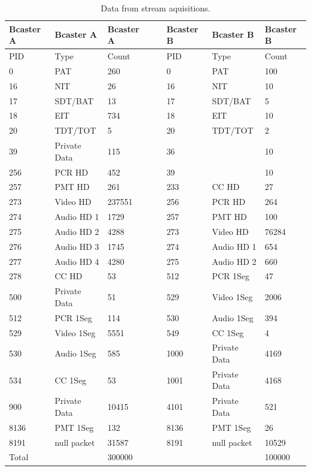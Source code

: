\documentclass[
	12pt,				%
	openright,			%
	twoside,			%
	a4paper,			%
	brazil,
	french,				%
	english
	]{abntex2}
\begin{document}
\begin{table}[b]
\centering
    \caption {Data from stream aquisitions.}
    \begin{tabular}{|l|l|l|l|l|l|l|}
    \hline
     Bcaster A  & Bcaster A          & Bcaster A    & ~ & Bcaster B & Bcaster B         & Bcaster B   \\ \hline
    PID   & Type         & Count  & ~ & PID  & Type         & Count  \\ \hline
    0     & PAT          & 260    & ~ & 0    & PAT          & 100    \\ \hline
    16    & NIT          & 26     & ~ & 16   & NIT          & 10     \\ \hline
    17    & SDT/BAT      & 13     & ~ & 17   & SDT/BAT      & 5      \\ \hline
    18    & EIT          & 734    & ~ & 18   & EIT          & 10     \\ \hline
    20    & TDT/TOT      & 5      & ~ & 20   & TDT/TOT      & 2      \\ \hline
    39    & Private Data & 115    & ~ & 36   & ~            & 10     \\ \hline
    256   & PCR HD       & 452    & ~ & 39   & ~            & 10     \\ \hline
    257   & PMT HD       & 261    & ~ & 233  & CC HD        & 27     \\ \hline
    273   & Video HD     & 237551 & ~ & 256  & PCR HD       & 264    \\ \hline
    274   & Audio HD 1   & 1729   & ~ & 257  & PMT HD       & 100    \\ \hline
    275   & Audio HD 2   & 4288   & ~ & 273  & Video HD     & 76284  \\ \hline
    276   & Audio HD 3   & 1745   & ~ & 274  & Audio HD 1   & 654    \\ \hline
    277   & Audio HD 4   & 4280   & ~ & 275  & Audio HD 2   & 660    \\ \hline
    278   & CC HD        & 53     & ~ & 512  & PCR 1Seg     & 47     \\ \hline
    500   & Private Data & 51     & ~ & 529  & Video 1Seg   & 2006   \\ \hline
    512   & PCR 1Seg     & 114    & ~ & 530  & Audio 1Seg   & 394    \\ \hline
    529   & Video 1Seg   & 5551   & ~ & 549  & CC 1Seg      & 4      \\ \hline
    530   & Audio 1Seg   & 585    & ~ & 1000 & Private Data & 4169   \\ \hline
    534   & CC 1Seg      & 53     & ~ & 1001 & Private Data & 4168   \\ \hline
    900   & Private Data & 10415  & ~ & 4101 & Private Data & 521    \\ \hline
    8136  & PMT 1Seg     & 132    & ~ & 8136 & PMT 1Seg     & 26     \\ \hline
    8191  & null packet  & 31587  & ~ & 8191 & null packet  & 10529  \\ \hline
    Total & ~            & 300000 & ~ & ~    & ~            & 100000 \\ \hline
    \end{tabular}
	\label{tab_dumps}
\end{table}
\end{document}
